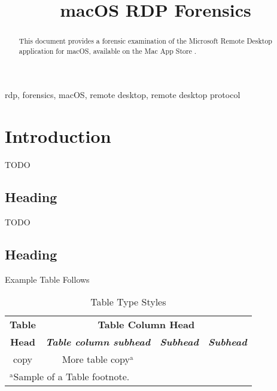 \documentclass[conference]{IEEEtran}
\begin{document}
\title{macOS RDP Forensics}

\author{
}

\maketitle

\begin{abstract}
This document provides a forensic examination of the Microsoft Remote Desktop application for macOS, available on the Mac App Store \cite{mrdpapp}.
\end{abstract}

\begin{IEEEkeywords}
rdp, forensics, macOS, remote desktop, remote desktop protocol
\end{IEEEkeywords}

\section{Introduction}
TODO

\subsection{Heading}

TODO

\subsection{Heading}

Example Table Follows

\begin{table}[htbp]
\caption{Table Type Styles}
\begin{center}
\begin{tabular}{|c|c|c|c|}
\hline
\textbf{Table}&\multicolumn{3}{|c|}{\textbf{Table Column Head}} \\
\cline{2-4} 
\textbf{Head} & \textbf{\textit{Table column subhead}}& \textbf{\textit{Subhead}}& \textbf{\textit{Subhead}} \\
\hline
copy& More table copy$^{\mathrm{a}}$& &  \\
\hline
\multicolumn{4}{l}{$^{\mathrm{a}}$Sample of a Table footnote.}
\end{tabular}
\label{tab1}
\end{center}
\end{table}
\end{document}
